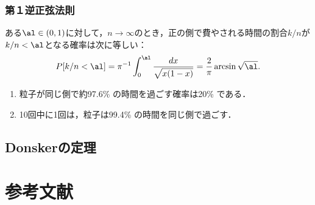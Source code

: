 \documentclass[uplatex,dvipdfmx]{jsreport}
\begin{document}
\subsection{第１逆正弦法則}

\begin{theorem}[第１逆正弦法則]
    ある$\al\in(0,1)$に対して，$n\to\infty$のとき，正の側で費やされる時間の割合$k/n$が$k/n<\al$となる確率は次に等しい：
    \[P[k/n<\al]=\pi^{-1}\int^\al_0\frac{dx}{\sqrt{x(1-x)}}=\frac{2}{\pi}\arcsin\sqrt{\al}.\]
\end{theorem}
\begin{corollary}\mbox{}
    \begin{enumerate}
        \item 粒子が同じ側で約97.6\% の時間を過ごす確率は20\% である．
        \item 10回中に1回は，粒子は99.4\% の時間を同じ側で過ごす．
    \end{enumerate}
\end{corollary}

\section{Donskerの定理}

\chapter{参考文献}
\end{document}
